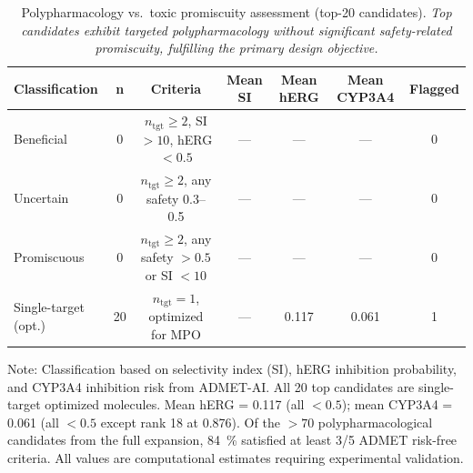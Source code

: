 \documentclass[journal=jcisd8,manuscript=suppinfo]{achemso}
\begin{document}
\begin{table}[htbp]
\centering
\caption{Polypharmacology vs.\ toxic promiscuity assessment (top-20 candidates). \textit{Top candidates exhibit targeted polypharmacology without significant safety-related promiscuity, fulfilling the primary design objective.}}
\label{tab:sm_s21_polypharm}
\begin{tabular}{lcccccc}
\toprule
\textbf{Classification} & \textbf{n} & \textbf{Criteria} & \textbf{Mean SI} & \textbf{Mean hERG} & \textbf{Mean CYP3A4} & \textbf{Flagged} \\
\midrule
Beneficial & \num{0} & $n_{\text{tgt}} \geq \num{2}$, SI $>\num{10}$, hERG $<\num{0.5}$ & --- & --- & --- & \num{0} \\
Uncertain & \num{0} & $n_{\text{tgt}} \geq \num{2}$, any safety \numrange{0.3}{0.5} & --- & --- & --- & \num{0} \\
Promiscuous & \num{0} & $n_{\text{tgt}} \geq \num{2}$, any safety $>\num{0.5}$ or SI $<\num{10}$ & --- & --- & --- & \num{0} \\
Single-target (opt.) & \num{20} & $n_{\text{tgt}} = \num{1}$, optimized for MPO & --- & \num{0.117} & \num{0.061} & \num{1} \\
\bottomrule
\end{tabular}
\vspace{0.5em}
\begin{footnotesize}
Note: Classification based on selectivity index (SI), hERG inhibition probability,
and CYP3A4 inhibition risk from ADMET-AI. All \num{20} top candidates are single-target
optimized molecules. Mean hERG = \num{0.117} (all $<\num{0.5}$); mean CYP3A4 = \num{0.061} (all $<\num{0.5}$
except rank \num{18} at \num{0.876}). Of the $>\num{70}$ polypharmacological candidates from the full
expansion, \qty{84}{\percent} satisfied at least \num{3}/\num{5} ADMET risk-free criteria.
All values are computational estimates requiring experimental validation.
\end{footnotesize}
\end{table}
\end{document}
